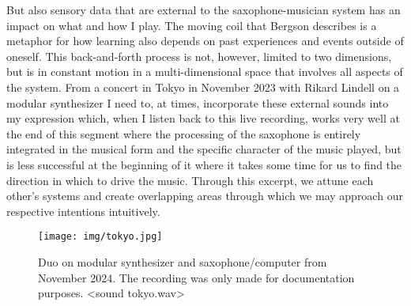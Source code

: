 \documentclass[11pt]{article}
\begin{document}
But also sensory data that are external to the saxophone-musician system has an impact on what and how I play.
The moving coil that Bergson describes is a metaphor for how learning also depends on past experiences and events outside of oneself.
This back-and-forth process is not, however, limited to two dimensions, but is in constant motion in a multi-dimensional space that involves all aspects of the system.
From a concert in Tokyo in November 2023 with  Rikard Lindell on a modular synthesizer I need to, at times, incorporate these external sounds into my  expression which, when I listen back to this live recording, works very well at the end of this segment where the processing of the saxophone is entirely integrated in the musical form and the specific character of the music played, but is less successful at the beginning of it where it takes some time for us to find the direction in which to drive the music.
Through this excerpt, we attune each other's systems and create overlapping areas through which we may approach our respective intentions intuitively.

\begin{figure}[htbp]
\centering
\texttt{[image: img/tokyo.jpg]}
\caption{\label{fig:org59007ef}Duo on modular synthesizer and saxophone/computer from November 2024. The recording was only made for documentation purposes. <sound tokyo.wav>}
\end{figure}
\end{document}
